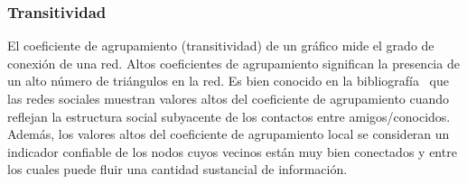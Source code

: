 \subsubsection{Transitividad} El coeficiente de agrupamiento (transitividad) de un gráfico mide el grado de conexión de una red. Altos coeficientes de agrupamiento significan la presencia de un alto número de triángulos en la red. Es bien conocido en la bibliografía~\cite{wasserman1994social} que las redes sociales muestran valores altos del coeficiente de agrupamiento cuando reflejan la estructura social subyacente de los contactos entre amigos/conocidos. Además, los valores altos del coeficiente de agrupamiento local se consideran un indicador confiable de los nodos cuyos vecinos están muy bien conectados y entre los cuales puede fluir una cantidad sustancial de información.